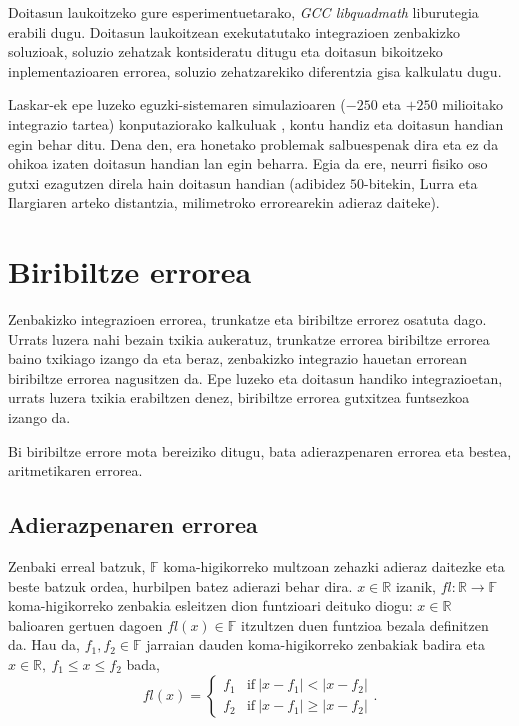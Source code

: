 Doitasun laukoitzeko gure esperimentuetarako, \emph{GCC libquadmath} liburutegia \cite{libquad} erabili dugu. Doitasun laukoitzean exekutatutako integrazioen zenbakizko soluzioak, soluzio zehatzak kontsideratu ditugu eta  doitasun bikoitzeko inplementazioaren errorea, soluzio zehatzarekiko diferentzia gisa kalkulatu dugu. 

Laskar-ek epe luzeko eguzki-sistemaren simulazioaren ($-250$ eta $+250$ milioitako integrazio tartea) konputaziorako kalkuluak \cite{Laskar2011}, kontu handiz eta doitasun handian egin behar ditu. Dena den, era honetako problemak salbuespenak dira eta ez da ohikoa izaten doitasun handian lan egin beharra. Egia da ere, neurri fisiko oso gutxi ezagutzen direla  hain doitasun handian (adibidez $50$-bitekin, Lurra eta Ilargiaren arteko distantzia, milimetroko errorearekin adieraz daiteke).  


\section{Biribiltze errorea}

Zenbakizko integrazioen errorea, trunkatze eta biribiltze errorez osatuta dago. Urrats luzera nahi bezain txikia aukeratuz, trunkatze errorea biribiltze errorea baino txikiago izango da eta beraz, zenbakizko integrazio hauetan errorean biribiltze errorea nagusitzen da. Epe luzeko eta doitasun handiko integrazioetan, urrats luzera txikia erabiltzen denez, biribiltze errorea gutxitzea funtsezkoa izango da.     

Bi biribiltze errore mota bereiziko ditugu, bata adierazpenaren errorea eta bestea, aritmetikaren errorea.  

\subsection*{Adierazpenaren errorea} 

Zenbaki erreal batzuk, $\mathbb{F}$ koma-higikorreko multzoan zehazki adieraz daitezke eta beste batzuk ordea, hurbilpen batez adierazi behar dira. $x \in \mathbb{R}$ izanik, $fl: \mathbb{R} \rightarrow \mathbb{F}$ koma-higikorreko zenbakia esleitzen dion funtzioari deituko diogu:  $x \in \mathbb{R}$ balioaren gertuen dagoen  $fl(x) \in \mathbb{F}$ itzultzen duen funtzioa bezala definitzen da. Hau da, $f_1,f_2 \in \mathbb{F}$ jarraian dauden koma-higikorreko zenbakiak  badira eta $x \in \mathbb{R}, \ f_1\leqslant x \leqslant f_2$ bada,
\begin{equation*}
fl(x)=
\left\{
        \begin{array}{lc}
        f_1 & \mathrm{if} \ |x-f_1| < |x-f_2| \\
        f_2 & \mathrm{if} \ |x-f_1| \geqslant |x-f_2| 
        \end{array}.
\right.
\end{equation*}  

